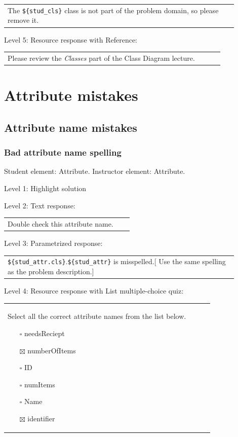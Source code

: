 \begin{tabular}{|p{0.9\linewidth}}
The \verb|${stud_cls}| class is not part of the problem domain, so please remove it.
\end{tabular} \medskip

\noindent Level 5: Resource response with Reference: \medskip

\begin{tabular}{|p{0.9\linewidth}}
Please review the \textit{Classes} part of the Class Diagram lecture.
\end{tabular} \medskip



\section{Attribute mistakes}

\subsection{Attribute name mistakes}

\subsubsection{Bad attribute name spelling}

Student element: Attribute. Instructor element: Attribute. \medskip

\noindent Level 1: Highlight solution  \medskip

\noindent Level 2: Text response: \medskip

\begin{tabular}{|p{0.9\linewidth}}
Double check this attribute name.
\end{tabular} \medskip

\noindent Level 3: Parametrized response: \medskip

\begin{tabular}{|p{0.9\linewidth}}
\verb|${stud_attr.cls}|.\verb|${stud_attr}| is misspelled.[ Use the same spelling as the problem description.]
\end{tabular} \medskip

\noindent Level 4: Resource response with List multiple-choice quiz: \medskip

\begin{tabular}{|p{0.9\linewidth}}

Select all the correct attribute names from the list below.

\begin{itemize}
    \item[$\square$] needsReciept
    \item[$\boxtimes$] numberOfItems
    \item[$\square$] ID
    \item[$\square$] numItems
    \item[$\square$] Name
    \item[$\boxtimes$] identifier
\end{itemize}

\end{tabular} \medskip

